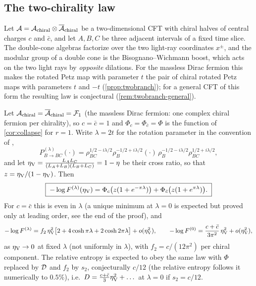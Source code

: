 \label{sec:2d}
\subsection{The two-chirality law}
Let $\mathcal A=\mathcal A_{\rm chiral}\otimes\overline{\mathcal A}_{\rm chiral}$ be a
two-dimensional CFT with chiral halves of central charges $c$ and $\bar c$, and
let $A,B,C$ be three adjacent intervals of a fixed time slice.  The double-cone
algebras factorize over the two light-ray coordinates $x^\pm$, and the modular
group of a double cone is the Bisognano--Wichmann boost, which acts on the two
light rays by \emph{opposite} dilations.  For the massless Dirac fermion this makes the rotated Petz map with
parameter $t$ the pair of chiral rotated Petz maps with parameters $t$ and
$-t$ (\cref{prop:twobranch}); for a general CFT of this form the resulting law is conjectural (\cref{rem:twobranch-general}).

\begin{proposition}\label{prop:twobranch}
Let $\mathcal A_{\rm chiral}=\overline{\mathcal A}_{\rm chiral}=\mathcal F_1$ (the massless Dirac fermion: one complex chiral fermion per chirality), so $c=\bar c=1$ and $\Phi_c=\Phi_{\bar c}=\Phi$ is the function of \cref{cor:collapse} for $r=1$.
Write $\lambda=2t$ for the rotation parameter in the convention of \cite{VWZ},
\begin{equation}\label{eq:vwz-channel}
 P^{(\lambda)}_{B\to BC}(\cdot)=\rho_{BC}^{1/2-i\lambda/2}\rho_B^{-1/2+i\lambda/2}
 (\cdot)\,\rho_B^{-1/2-i\lambda/2}\rho_{BC}^{1/2+i\lambda/2},
\end{equation}
and let
$\eta_{\rm V}=\frac{L_AL_C}{(L_A+L_B)(L_B+L_C)}=1-\eta$ be their cross ratio, so
that $z=\eta_{\rm V}/(1-\eta_{\rm V})$.  Then
\begin{equation}\label{eq:twobranch}
 \boxed{\;-\log F^{(\lambda)}(\eta_{\rm V})
 =\Phi_{c}\bigl(z(1+e^{-\pi\lambda})\bigr)
 +\Phi_{\bar c}\bigl(z(1+e^{\pi\lambda})\bigr).\;}
\end{equation}
For $c=\bar c$ this is even in $\lambda$ (a unique minimum at
$\lambda=0$ is expected but proved only at leading order, see the end of the proof), and
\begin{equation}\label{eq:twobranch-small}
 -\log F^{(\lambda)}
 =f_2\,\eta_{\rm V}^2\bigl[2+4\cosh\pi\lambda+2\cosh2\pi\lambda\bigr]
 +o(\eta_{\rm V}^2),
 \qquad
 -\log F^{(0)}=\frac{c+\bar c}{3\pi^2}\,\eta_{\rm V}^2+o(\eta_{\rm V}^2),
\end{equation}
as $\eta_{\rm V}\to0$ at fixed $\lambda$ (not uniformly in $\lambda$), with $f_2=c/(12\pi^2)$ per chiral component.  The relative entropy is expected to obey the same
law with $\Phi$ replaced by $\mathcal D$ and $f_2$ by $s_2$, conjecturally $c/12$ (the relative entropy follows it numerically to $0.5\%$), i.e.\
$D=\frac{c+\bar c}3\eta_{\rm V}^2+\dots$ at $\lambda=0$ if $s_2=c/12$.
\end{proposition}

